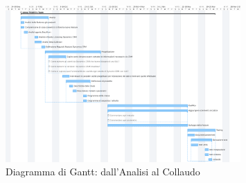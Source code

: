  \begin{figure}[H]
    \centering
    \captionsetup{justification=centering,margin=2cm}
        \includegraphics[width=0.8\textwidth ]{figures/gantt.pdf}
        \caption [Diagramma di Gantt: attività pianificate]{Diagramma di Gantt: dall'Analisi al Collaudo \label{fig:gantt}}
\end{figure}


